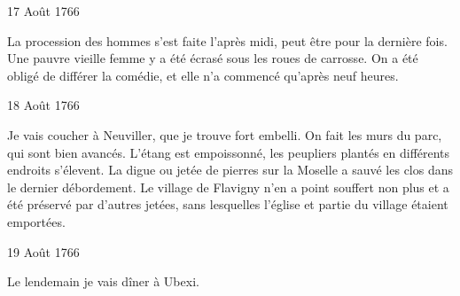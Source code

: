                      \begin{diary}{17 Août 1766}{}
                        
                         La procession des
                           hommes s'est faite l'après midi,
                           peut être pour la dernière fois. Une pauvre
                           vieille femme y a été écrasé sous les roues de
                           carrosse. On a été obligé de différer la comédie,
                           et elle n'a commencé qu'après neuf heures. \bigskip
        
        
                     \end{diary}

                     \begin{diary}{18 Août 1766}{}
                        
                         Je vais coucher à Neuviller, que je trouve
                           fort embelli. On fait les murs du parc, qui
                           sont bien avancés. L'étang est empoissonné,
                           les peupliers plantés en différents endroits s'élevent.
                           La digue ou jetée de pierres sur la Moselle a
                           sauvé les clos dans le dernier débordement.
                           Le village de Flavigny n'en a
                           point souffert non
                           plus et a été préservé par d'autres jetées,
                           sans lesquelles l’église et partie du village
                           étaient emportées. \bigskip
        
        
                     \end{diary}

                     \begin{diary}{19 Août 1766}{}
                        
                         Le lendemain je vais dîner à
                              Ubexi. \bigskip
        
        
                     \end{diary}


